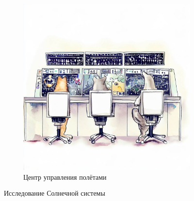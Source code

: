 \documentclass[a5paper,11pt]{memoir}
\begin{document}
\begin{figure}[h]
  \begin{subfigure}{\textwidth}
    \centering
    \includegraphics[width=.8\linewidth]{images/control-center.jpg}
    \caption{Центр управления полётами}
  \end{subfigure}
  \caption{Исследование Солнечной системы}
\end{figure}




\restoregeometry
\end{document}

